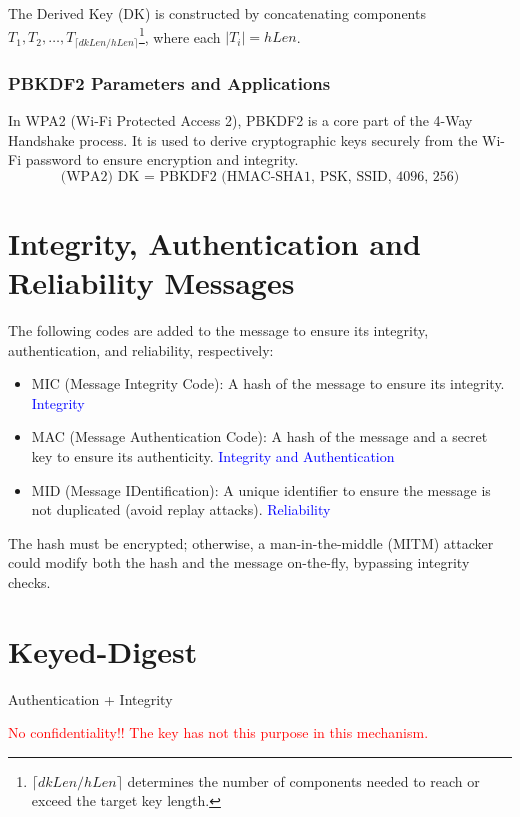 The Derived Key (DK) is constructed by concatenating components $T_1, T_2, \dots, T_{\lceil dkLen/hLen \rceil}$\footnote{$\lceil dkLen / hLen \rceil$  determines the number of components needed to reach or exceed the target key length.}, where each $|T_i| = hLen$.

\subsubsection*{PBKDF2 Parameters and Applications}
In WPA2 (Wi-Fi Protected Access 2), PBKDF2 is a core part of the 4-Way Handshake process. It is used to derive cryptographic keys securely from the Wi-Fi password to ensure encryption and integrity.
\[
    \text{(WPA2) DK = PBKDF2 (HMAC-SHA1, PSK, SSID, 4096, 256)}
\]

\section{Integrity, Authentication and Reliability Messages}
The following codes are added to the message to ensure its integrity, authentication, and reliability, respectively:
\begin{itemize}
    \item MIC (Message Integrity Code): A hash of the message to ensure its integrity. \textcolor{Blue}{Integrity}
    \item MAC (Message Authentication Code): A hash of the message and a secret key to ensure its authenticity. \textcolor{Blue}{Integrity and Authentication}
    \item MID (Message IDentification): A unique identifier to ensure the message is not duplicated (avoid replay attacks). \textcolor{Blue}{Reliability}
\end{itemize}
\begin{tcolorbox}[colback=red!10!white, colframe=red!70!black, coltitle=white, title=Beware]
    The hash must be encrypted; otherwise, a man-in-the-middle (MITM) attacker could modify both the hash and the message on-the-fly, bypassing integrity checks.
\end{tcolorbox}

\section{Keyed-Digest}
\begin{center}
    Authentication + Integrity
\end{center}
\textcolor{Red}{No confidentiality!! The key has not this purpose in this mechanism.}

